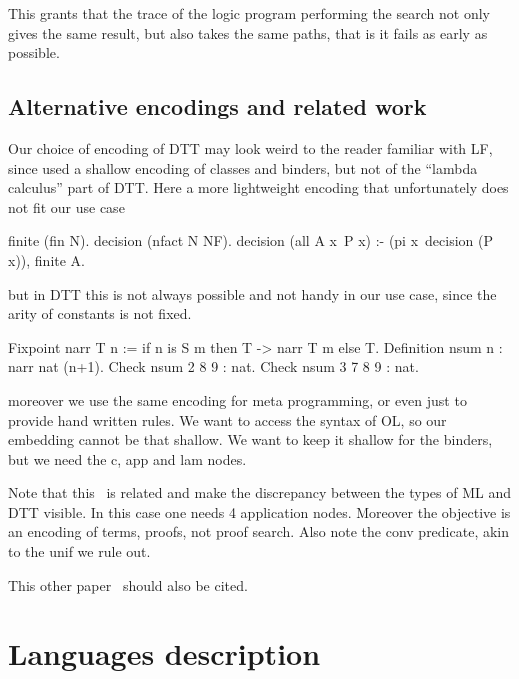 \documentclass[sigconf,natbib=false]{acmart}
\begin{document}
This grants that the trace of the logic program
performing the search not only gives the same result, but
also takes the same paths, that is it fails as early as possible.


\subsection{Alternative encodings and related work}


Our choice of encoding of DTT may look weird to the reader familiar with
LF, since used a shallow encoding of classes and binders, but not of the
``lambda calculus'' part of DTT. Here a more lightweight encoding
that unfortunately does not fit our use case

\begin{elpicode}
finite (fin N).
decision (nfact N NF).
decision (all A x\ P x) :- 
  (pi x\ decision (P x)), finite A.
\end{elpicode}

but in DTT this is not always possible and not handy in our use case,
since the arity of constants is not fixed.

\begin{coqcode}
Fixpoint narr T n := 
  if n is S m then T -> narr T m else T.
Definition nsum n : narr nat (n+1).
Check nsum 2   8 9 : nat.
Check nsum 3 7 8 9 : nat.
\end{coqcode}
  
moreover we use the same encoding for meta programming, or even just to provide
hand written rules. We want to access the syntax of OL, so our embedding cannot
be that shallow. We want to keep it shallow for the binders, but we need
the c, app and lam nodes. %


Note that this~\cite{felty93lics} is related and make the
discrepancy between the types of ML and DTT visible. In this case
one needs 4 application nodes. Moreover the objective is an encoding
of terms, proofs, not proof search. Also note the conv predicate,
akin to the unif we rule out.

This other paper~\cite{10.1007/978-3-031-38499-8_25} should also be cited.

\section{Languages description}
\label{sec:lang-spec}



\end{document}
